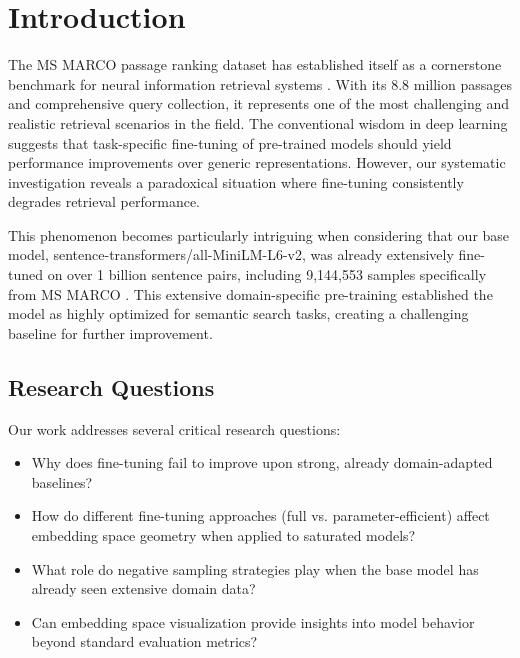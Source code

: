 
\chapter{Introduction} %

\label{Chapter1} %


\newcommand{\keyword}[1]{\textbf{#1}}
\newcommand{\tabhead}[1]{\textbf{#1}}
\newcommand{\code}[1]{\texttt{#1}}
\newcommand{\file}[1]{\texttt{\bfseries#1}}
\newcommand{\option}[1]{\texttt{\itshape#1}}


The MS MARCO passage ranking dataset has established itself as a cornerstone benchmark for neural information retrieval systems \cite{msmarco}. With its 8.8 million passages and comprehensive query collection, it represents one of the most challenging and realistic retrieval scenarios in the field. The conventional wisdom in deep learning suggests that task-specific fine-tuning of pre-trained models should yield performance improvements over generic representations. However, our systematic investigation reveals a paradoxical situation where fine-tuning consistently degrades retrieval performance.

This phenomenon becomes particularly intriguing when considering that our base model, sentence-transformers/all-MiniLM-L6-v2, was already extensively fine-tuned on over 1 billion sentence pairs, including 9,144,553 samples specifically from MS MARCO \cite{huggingface_minilm}. This extensive domain-specific pre-training established the model as highly optimized for semantic search tasks, creating a challenging baseline for further improvement.

\section{Research Questions}

Our work addresses several critical research questions:

\begin{itemize}
\item Why does fine-tuning fail to improve upon strong, already domain-adapted baselines?
\item How do different fine-tuning approaches (full vs. parameter-efficient) affect embedding space geometry when applied to saturated models?
\item What role do negative sampling strategies play when the base model has already seen extensive domain data?
\item Can embedding space visualization provide insights into model behavior beyond standard evaluation metrics?
\end{itemize}

